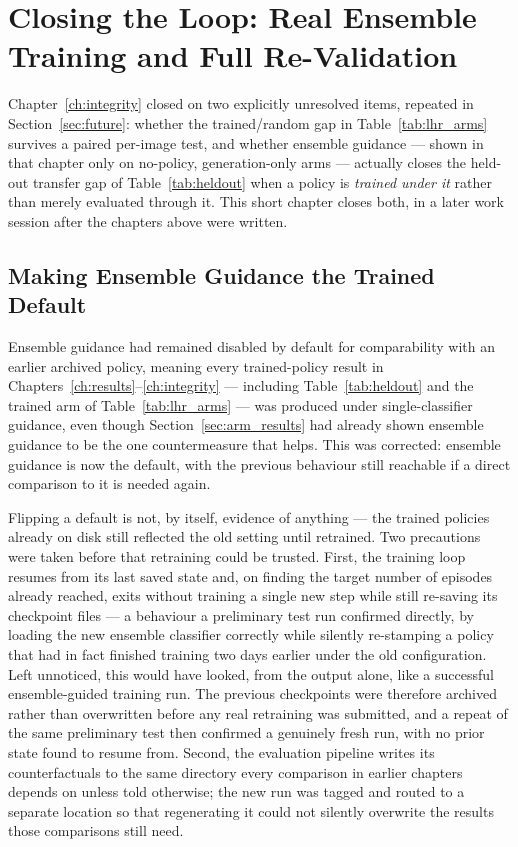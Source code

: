 \chapter{Closing the Loop: Real Ensemble Training and Full Re-Validation}
\label{ch:closing}

Chapter~\ref{ch:integrity} closed on two explicitly unresolved items,
repeated in Section~\ref{sec:future}: whether the trained/random gap in
Table~\ref{tab:lhr_arms} survives a paired per-image test, and whether
ensemble guidance --- shown in that chapter only on no-policy,
generation-only arms --- actually closes the held-out transfer gap of
Table~\ref{tab:heldout} when a policy is \emph{trained under it} rather
than merely evaluated through it. This short chapter closes both, in a
later work session after the chapters above were written.

\section{Making Ensemble Guidance the Trained Default}

Ensemble guidance had remained disabled by default for comparability with
an earlier archived policy, meaning every trained-policy result in
Chapters~\ref{ch:results}--\ref{ch:integrity} --- including
Table~\ref{tab:heldout} and the trained arm of Table~\ref{tab:lhr_arms} ---
was produced under single-classifier guidance, even though
Section~\ref{sec:arm_results} had already shown ensemble guidance to be
the one countermeasure that helps. This was corrected: ensemble guidance
is now the default, with the previous behaviour still reachable if a
direct comparison to it is needed again.

Flipping a default is not, by itself, evidence of anything --- the trained
policies already on disk still reflected the old setting until retrained.
Two precautions were taken before that retraining could be trusted.
First, the training loop resumes from its last saved state and, on
finding the target number of episodes already reached, exits without
training a single new step while still re-saving its checkpoint files ---
a behaviour a preliminary test run confirmed directly, by loading the new
ensemble classifier correctly while silently re-stamping a policy that had
in fact finished training two days earlier under the old configuration.
Left unnoticed, this would have looked, from the output alone, like a
successful ensemble-guided training run. The previous checkpoints were
therefore archived rather than overwritten before any real retraining was
submitted, and a repeat of the same preliminary test then confirmed a
genuinely fresh run, with no prior state found to resume from. Second, the
evaluation pipeline writes its counterfactuals to the same directory every
comparison in earlier chapters depends on unless told otherwise; the new
run was tagged and routed to a separate location so that regenerating it
could not silently overwrite the results those comparisons still need.

